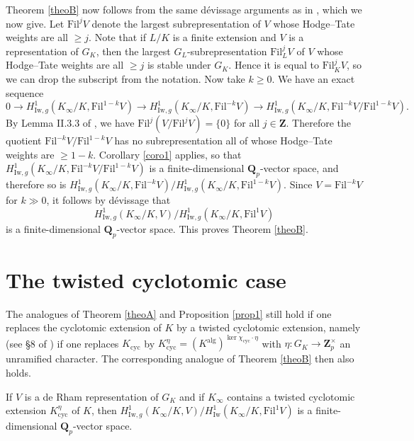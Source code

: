 \documentclass[12pt,english,a4paper]{smfart}
\newcommand{\Qp}{\mathbf{Q}_p}
\newcommand{\Zp}{\mathbf{Z}_p}
\newcommand{\ZZ}{\mathbf{Z}}
\newcommand{\Iw}{\mathrm{Iw}}
\newcommand{\Fil}{\mathrm{Fil}}
\newcommand{\alg}{\mathrm{alg}}
\newcommand{\cyc}{\mathrm{cyc}}
\begin{document}
Theorem \ref{theoB} now follows from the same d\'evissage arguments as in \cite{Ber05}, which we now give. Let $\Fil^j V$ denote the largest subrepresentation of $V$ whose Hodge--Tate weights are all $\geq j$. Note that if $L/K$ is a finite extension and $V$ is a representation of $G_K$, then the largest $G_L$-subrepresentation $\Fil_L^j V$ of $V$ whose Hodge--Tate weights are all $\geq j$ is stable under $G_K$. Hence it is equal to $\Fil_K^j V$, so we can drop the subscript from the notation. Now take $k \geq 0$. We have an exact sequence
\[ 0 \to H^1_{\Iw,g}(K_\infty/K,\Fil^{1-k} V) \to H^1_{\Iw,g}(K_\infty/K, \Fil^{-k} V) \to H^1_{\Iw,g}(K_\infty/K,\Fil^{-k} V / \Fil^{1-k} V). \]
By Lemma II.3.3 of \cite{Ber05}, we have $\Fil^j(V/\Fil^j V) = \{0\}$ for all $j \in \ZZ$. 
Therefore the quotient $\Fil^{-k} V / \Fil^{1-k} V$ has no subrepresentation all of whose Hodge--Tate weights are $\geq 1-k$. Corollary \ref{coro1} applies, so that $H^1_{\Iw,g}(K_\infty/K,\Fil^{-k} V / \Fil^{1-k} V)$ is a finite-dimensional $\Qp$-vector space, and therefore so is $H^1_{\Iw,g}(K_\infty/K, \Fil^{-k} V) / H^1_{\Iw,g}(K_\infty/K, \Fil^{1-k} V)$. 
Since $V = \Fil^{-k} V$ for $k \gg 0$, it follows by d\'evissage that 
\[ H^1_{\Iw,g}(K_\infty/K,V) / H^1_{\Iw,g}(K_\infty/K, \Fil^1 V) \] 
is a finite-dimensional $\Qp$-vector space. This proves Theorem \ref{theoB}.

\section{The twisted cyclotomic case}

The analogues of Theorem \ref{theoA} and Proposition \ref{prop1} still hold if one replaces the cyclotomic extension of $K$ by a twisted cyclotomic extension, namely (see \S 8 of \cite{Ber16}) if one replaces $K_{\cyc}$ by $K_{\cyc}^{\eta} = (K^{\alg})^{\ker \chi_{\cyc} \cdot \eta}$ with $\eta : G_K \to \Zp^\times$ an unramified character. The corresponding analogue of Theorem \ref{theoB} then also holds.

\begin{theo}
\label{theoC}
If $V$ is a de Rham representation of $G_K$ and if $K_\infty$ contains a twisted cyclotomic extension $K_{\cyc}^\eta$ of $K$, then $H^1_{\Iw,g}(K_\infty/K,V)  / H^1_{\Iw}(K_\infty/K,\Fil^1 V)$ is a finite-dimensional $\Qp$-vector space.
\end{theo}
\end{document}
